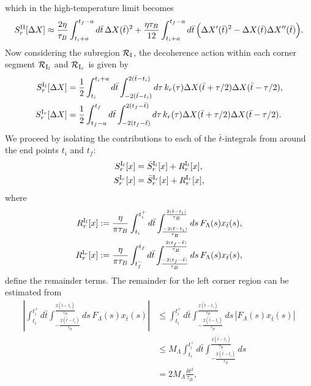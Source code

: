 \documentclass[prl,twocolumn,superscriptaddress,amsmath,amssymb]{revtex4-2}
\def\be{\begin{equation}}
\def\ee{\end{equation}}
\newcommand{\tb}{\bar{t}}
\begin{document}
which in the high-temperature limit becomes
\be\label{eq:dec_func_II_htl}
	S^{\rm II}_r[\Delta X] \approx \frac{2\eta}{\tau_B}\int^{t_f-a}_{t_i+a}d\tb\,\Delta X(\tb)^2 + \frac{\eta\tau_B}{12}\int^{t_f-a}_{t_i+a}d\tb\,\Big(\Delta X'(\tb)^2 - \Delta X(\tb)\Delta X''(\tb)\Big).
\ee
Now considering the subregion $\mathcal{R}_{\rm I}$, the decoherence action within each corner segment $\mathcal{R}_{{\rm I}_l}$ and $\mathcal{R}_{{\rm I}_r}$ is given by 
\begin{subequations}
\begin{align}
    S^{{\rm I}_l}_r[\Delta X] &= \frac{1}{2}\int^{t_i+a}_{t_i}d\tb\int^{2(\tb-t_i)}_{-2(\tb-t_i)}d\tau\,k_r(\tau)\Delta X(\tb+\tau/2)\Delta X(\tb-\tau/2), \label{eq:decoh_action_l} \\
    S^{{\rm I}_r}_r[\Delta X] &= \frac{1}{2}\int^{t_f}_{t_f-a}d\tb\int^{2(t_f-\tb)}_{-2(t_f-\tb)}d\tau\,k_r(\tau)\Delta X(\tb+\tau/2)\Delta X(\tb-\tau/2). \label{eq:decoh_action_r}
\end{align}
\end{subequations}
We proceed by isolating the contributions to each of the $\tb$-integrals from around the end points $t_i$ and $t_f$:
\begin{subequations}
\begin{align}
    S^{{\rm I}_l}_r[x] &= \bar{S}^{{\rm I}_l}_r[x] + R^{{\rm I}_l}_r[x], \\
    S^{{\rm I}_r}_r[x] &= \bar{S}^{{\rm I}_r}_r[x] + R^{{\rm I}_r}_r[x],
\end{align}
\end{subequations}
where 
\begin{subequations}
\begin{align}
    R^{{\rm I}_l}_r[x] &:= \frac{\eta}{\pi\tau_B}\int^{t^+_i}_{t_i}d\tb\int^{\frac{2(\tb - t_i)}{\tau_B}}_{\frac{-2(\tb - t_i)}{\tau_B}}ds\,F_{\Lambda}(s)x_{\tb}(s), \label{eq:R_left}\\ 
    R^{{\rm I}_r}_r[x] &:= \frac{\eta}{\pi\tau_B}\int^{t_f}_{t^-_f}d\tb\int^{\frac{2(t_f - \tb)}{\tau_B}}_{\frac{-2(t_f - \tb)}{\tau_B}}ds\,F_{\Lambda}(s)x_{\tb}(s),\label{eq:R_right}
\end{align}
\end{subequations}
define the remainder terms. The remainder for the left corner region can be estimated from
\begin{align}
    \left|\int^{t^+_i}_{t_i} d\tb\int^{\frac{2(\tb - t_i)}{\tau_B}}_{-\frac{2(\tb - t_i)}{\tau_B}} ds\,F_{\Lambda}(s)x_{\tb}(s)\right| &\leq \int^{t^+_i}_{t_i} d\tb\int^{\frac{2(\tb - t_i)}{\tau_B}}_{-\frac{2(\tb - t_i)}{\tau_B}} ds\,|F_{\Lambda}(s)x_{\tb}(s)| \nonumber\\
    &\leq M_{\Lambda}\int^{t^+_i}_{t_i} d\tb\int^{\frac{2(\tb - t_i)}{\tau_B}}_{-\frac{2(\tb - t_i)}{\tau_B}}ds \nonumber\\
    &= 2M_{\Lambda}\frac{\delta t^2}{\tau_B},
\end{align}
\end{document}
